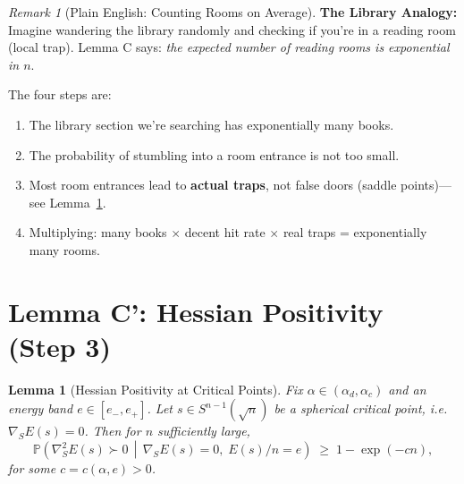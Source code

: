 \documentclass[11pt,a4paper]{article}
\theoremstyle{plain}
\newtheorem{lemma}[theorem]{Lemma}
\theoremstyle{definition}
\theoremstyle{remark}
\newtheorem{remark}[theorem]{Remark}
\begin{document}
\begin{remark}[Plain English: Counting Rooms on Average]
\textbf{The Library Analogy:} Imagine wandering the library randomly and checking if you're in a reading room (local trap). Lemma C says: \textit{the expected number of reading rooms is exponential in $n$}.

The four steps are:
\begin{enumerate}
    \item The library section we're searching has exponentially many books.
    \item The probability of stumbling into a room entrance is not too small.
    \item Most room entrances lead to \textbf{actual traps}, not false doors (saddle points)---see Lemma~\ref{lem:hessian-positivity}.
    \item Multiplying: many books $\times$ decent hit rate $\times$ real traps = exponentially many rooms.
\end{enumerate}
\end{remark}

\section{Lemma C': Hessian Positivity (Step 3)}

\begin{lemma}[Hessian Positivity at Critical Points]
\label{lem:hessian-positivity}
Fix $\alpha\in(\alpha_d,\alpha_c)$ and an energy band $e\in[e_-,e_+]$. 
Let $s\in S^{n-1}(\sqrt{n})$ be a spherical critical point, i.e.\ $\nabla_S E(s)=0$. 
Then for $n$ sufficiently large,
\[
\mathbb{P}\!\left(\nabla_S^2 E(s)\succ 0 \,\middle|\, \nabla_S E(s)=0,\; E(s)/n=e\right)
\;\ge\; 1-\exp(-c n),
\]
for some $c=c(\alpha,e)>0$.
\end{lemma}
\end{document}

